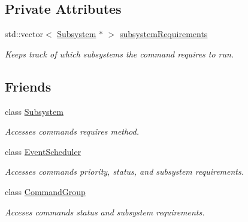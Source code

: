 \subsection*{Private Attributes}
\begin{DoxyCompactItemize}
\item 
std\+::vector$<$ \mbox{\hyperlink{classlib_iterative_robot_1_1_subsystem}{Subsystem}} $\ast$ $>$ \mbox{\hyperlink{classlib_iterative_robot_1_1_command_abbedf025246921d5cde67aa954b74d35}{subsystem\+Requirements}}
\begin{DoxyCompactList}\small\item\em Keeps track of which subsystems the command requires to run. \end{DoxyCompactList}\end{DoxyCompactItemize}
\subsection*{Friends}
\begin{DoxyCompactItemize}
\item 
\mbox{\label{classlib_iterative_robot_1_1_command_a9b67dc4c93b18626e753aa0938abbf7d}} 
class \mbox{\hyperlink{classlib_iterative_robot_1_1_command_a9b67dc4c93b18626e753aa0938abbf7d}{Subsystem}}
\begin{DoxyCompactList}\small\item\em Accesses commands\textquotesingle{} requires method. \end{DoxyCompactList}\item 
\mbox{\label{classlib_iterative_robot_1_1_command_a2a47195be57876de9e0c9e18467a34a3}} 
class \mbox{\hyperlink{classlib_iterative_robot_1_1_command_a2a47195be57876de9e0c9e18467a34a3}{Event\+Scheduler}}
\begin{DoxyCompactList}\small\item\em Accesses commands\textquotesingle{} priority, status, and subsystem requirements. \end{DoxyCompactList}\item 
\mbox{\label{classlib_iterative_robot_1_1_command_a74a5eec0a51871fda0db6a47a7eae304}} 
class \mbox{\hyperlink{classlib_iterative_robot_1_1_command_a74a5eec0a51871fda0db6a47a7eae304}{Command\+Group}}
\begin{DoxyCompactList}\small\item\em Acceses commands\textquotesingle{} status and subsystem requirements. \end{DoxyCompactList}\end{DoxyCompactItemize}


